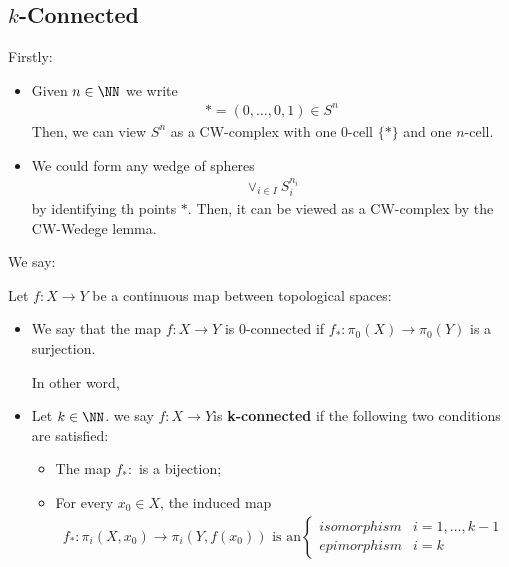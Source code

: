 \documentclass[Total.tex]{subfiles}
\begin{document}
	\subsection{$k$-Connected}
	Firstly:
	\begin{itemize}
		\item Given $n\in \NN$ we write
		\begin{gather*}
			*=(0,\dots,0,1)\in S^n
		\end{gather*}
		Then, we can view $S^n$ as a CW-complex with one $0$-cell $\{*\}$ and one $n$-cell.
		\item We could form any wedge of spheres
		\begin{gather*}
			\vee_{i\in I} S_i^{n_i}
		\end{gather*}
		by identifying th points $*$. Then, it can be viewed as a CW-complex by the CW-Wedege lemma.
	\end{itemize}
	We say:
	\begin{Def}
		Let $f:X\rightarrow Y$ be a continuous map between topological spaces:
		\begin{itemize}
			\item We say that the map $f:X\rightarrow Y$ is $0$-connected if $f_*:\pi_0(X)\rightarrow \pi_0(Y)$ is a surjection.
			
			In other word, 
			\item Let $k\in \NN$. we say $f:X\rightarrow Y$is \textbf{k-connected} if the following two conditions are satisfied:
			\begin{itemize}
				\item The map $f_*:$ is a bijection;
				\item For every $x_0\in X$, the induced map 		
				\begin{gather*}
					f_*:\pi_i(X,x_0)\rightarrow \pi_i(Y,f(x_0))\mbox{ is an}\begin{cases}
						isomorphism&i=1,\dots,k-1\\
						epimorphism&i=k
					\end{cases}
				\end{gather*}
			\end{itemize}
		\end{itemize}
	\end{Def}
	
\end{document}
